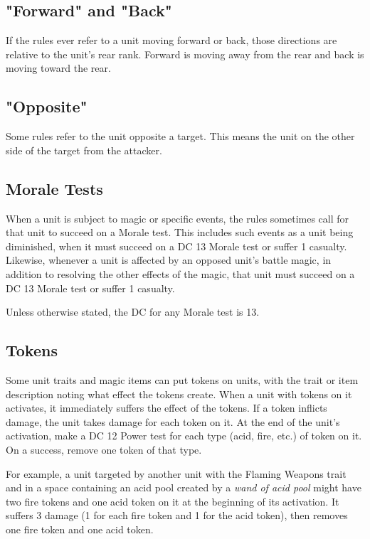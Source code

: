 \documentclass[10pt,a4paper,twoside,bg=print,twocolumn,openany,nodeprecatedcode]{dndbook}
\begin{document}
\subsection{"Forward" and "Back"}
If the rules ever refer to a unit moving forward or back, those directions are relative to the unit's rear rank. Forward is moving away from the rear and back is moving toward the rear.

\subsection{"Opposite"}
Some rules refer to the unit opposite a target. This means the unit on the other side of the target from the attacker.

\subsection{Morale Tests}
When a unit is subject to magic or specific events, the rules sometimes call for that unit to succeed on a Morale test. This includes such events as a unit being diminished, when it must succeed on a DC 13 Morale test or suffer 1 casualty. Likewise, whenever a unit is affected by an opposed unit's battle magic, in addition to resolving the other effects of the magic, that unit must succeed on a DC 13 Morale test or suffer 1 casualty.

Unless otherwise stated, the DC for any Morale test is 13.

\subsection{Tokens}
Some unit traits and magic items can put tokens on units, with the trait or item description noting what effect the tokens create. When a unit with tokens on it activates, it immediately suffers the effect of the tokens. If a token inflicts damage, the unit takes damage for each token on it. At the end of the unit's activation, make a DC 12 Power test for each type (acid, fire, etc.) of token on it. On a success, remove one token of that type.

For example, a unit targeted by another unit with the Flaming Weapons trait and in a space containing an acid pool created by a \textit{wand of acid pool} might have two fire tokens and one acid token on it at the beginning of its activation. It suffers 3 damage (1 for each fire token and 1 for the acid token), then removes one fire token and one acid token.
\end{document}
